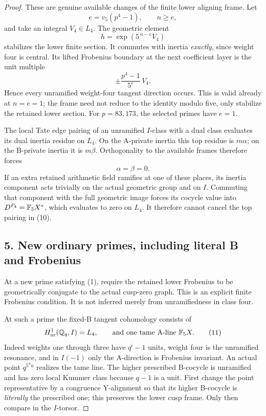 \documentclass[11pt]{article}
\begin{document}
\begin{proof}
These are genuine available changes of the finite lower aligning frame. Let
\[
 e=v_5(p^4-1),\qquad n\ge e,
\]
and take an integral $V_4\in L_4$. The geometric element
\[
 h=\exp(5^{\,n-e}V_4)
 \tag{8}
\]
stabilizes the lower finite section. It commutes with inertia \emph{exactly}, since weight four is central. Its lifted Frobenius boundary at the next coefficient layer is the unit multiple
\[
 \pm\frac{p^4-1}{5^e}\,V_4.
 \tag{9}
\]
Hence every unramified weight-four tangent direction occurs. This is valid already at $n=e=1$; the frame need not reduce to the identity modulo five, only stabilize the retained lower section. For $p=83,173$, the selected primes have $e=1$.

The local Tate edge pairing of an unramified $I$-class with a dual class evaluates its dual inertia residue on $L_4$. On the A-private inertia this top residue is $m\alpha$; on the B-private inertia it is $m\beta$. Orthogonality to the available frames therefore forces
\[
 \alpha=\beta=0.
 \tag{10}
\]
If an extra retained arithmetic field ramifies at one of these places, its inertia component acts trivially on the actual geometric group and on $I$. Commuting that component with the full geometric image forces its cocycle value into $D^{P_4}=\mathbb F_5X^*$, which evaluates to zero on $L_4$. It therefore cannot cancel the top pairing in (10).

\subsection*{5. New ordinary primes, including literal B and Frobenius}
At a new prime satisfying (1), require the retained lower Frobenius to be geometrically conjugate to the actual cusp-zero graph. This is an explicit finite Frobenius condition. It is not inferred merely from unramifiedness in class four.

At such a prime the fixed-B tangent cohomology consists of
\[
 H^1_{\mathrm{nr}}(\mathbb Q_q,I)=L_4,
 \qquad\text{and one tame A-line }\mathbb F_5X.
 \tag{11}
\]
Indeed weights one through three have $q^i-1$ units, weight four is the unramified resonance, and in $I(-1)$ only the A-direction is Frobenius invariant. An actual point $q^{5^n a}$ realizes the tame line. The higher prescribed B-cocycle is unramified and has zero local Kummer class because $q-1$ is a unit. First change the point representative by a congruence Y-alignment so that its higher B-cocycle is \emph{literally} the prescribed one; this preserves the lower cusp frame. Only then compare in the $I$-torsor.


\end{proof}
\end{document}
